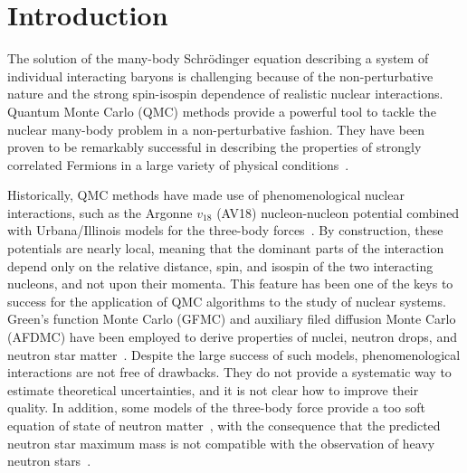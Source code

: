 \documentclass[aps,prc,twocolumn,superscriptaddress,floatfix]{revtex4-1}
\begin{document}
\maketitle

\section{Introduction}
\label{sec:intro}
The solution of the many-body Schr\"odinger equation describing a system of individual 
interacting baryons is challenging because of the non-perturbative 
nature and the strong spin-isospin dependence of realistic nuclear interactions. 
Quantum Monte Carlo (QMC) methods provide a powerful tool to tackle the nuclear 
many-body problem in a non-perturbative fashion. They have been proven to be 
remarkably successful in describing the properties of strongly correlated 
Fermions in a large variety of physical conditions~\cite{Carlson:2015}. 

Historically, QMC methods have made use of phenomenological nuclear interactions, 
such as the Argonne $v_{18}$ (AV18) nucleon-nucleon potential combined
with Urbana/Illinois models for the three-body forces~\cite{Carlson:2015}.
By construction, these potentials are nearly local, meaning that the dominant parts 
of the interaction depend only on the relative distance, spin, and isospin of the
two interacting nucleons, and not upon their momenta.
This feature has been one of the keys to success
for the application of QMC algorithms to the study of nuclear systems. Green's function
Monte Carlo (GFMC) and auxiliary filed diffusion Monte Carlo (AFDMC) have been employed 
to derive properties of nuclei, neutron drops, and neutron star 
matter~\cite{Gandolfi:2011,Gandolfi:2012,Maris:2013,Gandolfi:2014,Gandolfi:2014_epja,Buraczynski:2016,Buraczynski:2017}.
Despite the large success of such models, phenomenological interactions are not free of
drawbacks. They do not provide a systematic way to estimate theoretical uncertainties, 
and it is not clear how to improve their quality. In addition, some models of the 
three-body force provide a too soft equation of state of neutron matter~\cite{Sarsa:2003,Maris:2013},
with the consequence that the predicted neutron star maximum mass is not compatible
with the observation of heavy neutron stars~\cite{Demorest:2010,Antoniadis:2013}.
\end{document}
